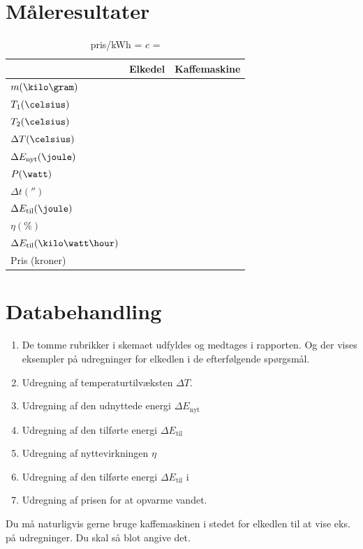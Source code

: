 \section{Måleresultater}
\begin{table}
\centering
\caption{pris/kWh = \hspace{5cm} $c$ =}
\label{tbl:data.forsøg1}
\begin{tabular}{ @{ } p{3cm}  p{3cm}  p{3cm} @{ } }
	\toprule[2pt]
			&	Elkedel	&	Kaffemaskine	\\
	\midrule[1.2pt]
	$m (\kilo\gram)$					&			&				\\
	$T_{1} (\celsius)$					&			&				\\
	$T_{2} (\celsius)$					&			&				\\
	$\Delta T (\celsius)$					&			&				\\
	$\Delta E_{\mathrm{nyt}} (\joule)$		&			&				\\
	$P (\watt)$						&			&				\\
	$\Delta t (\second)$					&			&				\\
	$\Delta E_{\mathrm{til}} (\joule)$		&			&				\\
	$\eta (\%)$						&			&				\\
	$\Delta E_{\mathrm{til}} (\kilo\watt\hour)$	&			&				\\
	Pris (kroner)						&			&				\\
	\bottomrule[2pt]
\end{tabular}
\end{table}

\section{Databehandling}
\begin{enumerate}
	\item De tomme rubrikker i skemaet udfyldes og medtages i rapporten. Og der vises eksempler på udregninger for elkedlen i de efterfølgende spørgsmål.
	\item Udregning af temperaturtilvæksten $\Delta T$.
	\item Udregning af den udnyttede energi  $\Delta E_{\mathrm{nyt}}$
	\item Udregning af den tilførte energi $\Delta E_{\mathrm{til}}$
	\item Udregning af nyttevirkningen $\eta$
	\item Udregning af den tilførte energi $\Delta E_{\mathrm{til}}$ i \kilo\watt\hour
	\item Udregning af prisen for at opvarme vandet.
\end{enumerate}
Du må naturligvis gerne bruge kaffemaskinen i stedet for elkedlen til at vise eks. på udregninger. Du skal så blot angive det.

